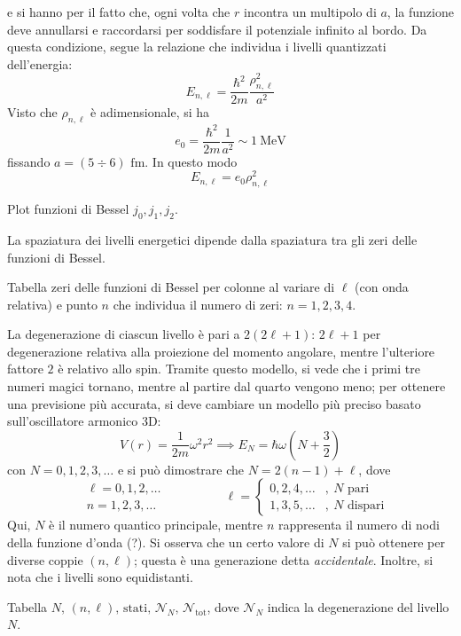 \documentclass[11pt, a4paper]{scrartcl}
\theoremstyle{style}
\newenvironment{boxenv}[1][]{
    \begin{eqbox}[#1]
    }{
   \end{eqbox}
}
\numberwithin{equation}{subsection}
\begin{document}
e si hanno per il fatto che, ogni volta che $r$ incontra un multipolo di $a$, la funzione deve annullarsi e raccordarsi per soddisfare il potenziale infinito al bordo.
Da questa condizione, segue la relazione che individua i livelli quantizzati dell'energia:
\begin{equation}
	E_{n,\ell } = \frac{\hbar ^2}{2m} \frac{\rho _{n,\ell }^2}{a^2}
\end{equation}
Visto che $\rho _{n,\ell } $ \`e adimensionale, si ha
\[
e_0 = \frac{\hbar ^2}{2m} \frac{1}{a^2} \sim 1~ \text{MeV}
\] 
fissando $a = (5\div 6) \text{ fm}$.
In questo modo
\[
E_{n,\ell } = e_0 \rho _{n,\ell } ^2
\] 
\begin{boxenv}[]
Plot funzioni di Bessel $j_0,j_1,j_2$.
\end{boxenv}
\noindent La spaziatura dei livelli energetici dipende dalla spaziatura tra gli zeri delle funzioni di Bessel.
\begin{boxenv}[]
Tabella zeri delle funzioni di Bessel per colonne al variare di $\ell $ (con onda relativa) e punto $n$ che individua il numero di zeri: $n=1,2,3,4$.
\end{boxenv}
\noindent La degenerazione di ciascun livello \`e pari a $2(2\ell +1)$: $2\ell +1$ per degenerazione relativa alla proiezione del momento angolare, mentre l'ulteriore fattore $2$ \`e relativo allo spin.
Tramite questo modello, si vede che i primi tre numeri magici tornano, mentre al partire dal quarto vengono meno; per ottenere una previsione pi\`u accurata, si deve cambiare un modello pi\`u preciso basato sull'oscillatore armonico 3D:
\[
V(r) = \frac{1}{2 m}\omega ^2 r^2 \implies E_N = \hbar \omega \left(N + \frac{3}{2}\right) 
\] 
con $N = 0,1,2,3,\ldots$ e si pu\`o dimostrare che $N = 2 (n-1) + \ell $, dove
\[
	\begin{split}
		&\ell =0,1,2,\ldots\\
		& n = 1,2,3,\ldots
	\end{split} \hspace{2cm} \ell =\begin{cases}
		0,2,4,\ldots &,\ N\text{ pari}\\
		1,3,5,\ldots &,\ N \text{ dispari}
	\end{cases}
\] 
Qui, $N$ \`e il numero quantico principale, mentre $n$ rappresenta il numero di nodi della funzione d'onda ({\color{red}?}).
Si osserva che un certo valore di $N$ si pu\`o ottenere per diverse coppie $(n,\ell )$; questa \`e una generazione detta \textit{accidentale}.
Inoltre, si nota che i livelli sono equidistanti.
\begin{boxenv}[]
Tabella $N,\, (n,\ell ),\, \text{stati},\, \mathcal{N} _N, \, \mathcal{N} _\text{tot}$, dove $\mathcal{N}_N $ indica la degenerazione del livello $N$.
\end{boxenv}
\end{document}
